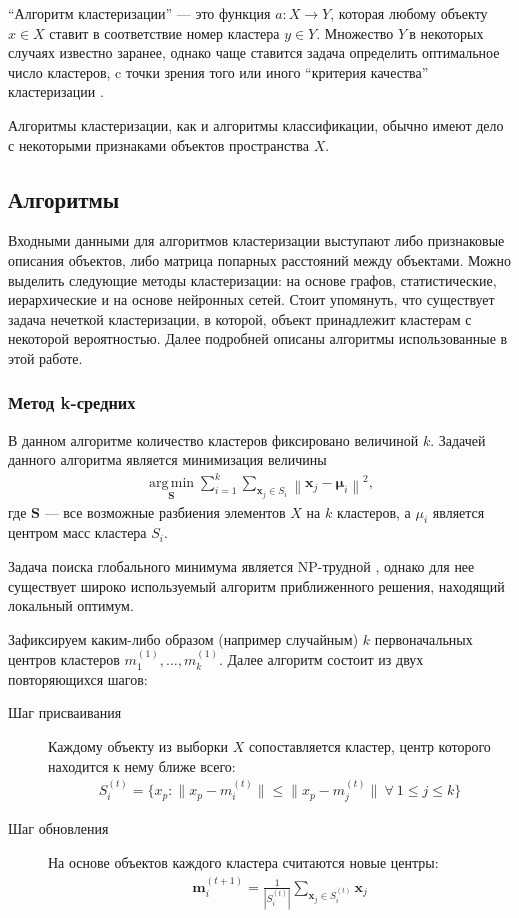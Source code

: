 ``Алгоритм кластеризации'' --- это функция $a\colon X\to Y$, которая любому объекту $x\in X$ ставит в соответствие номер кластера $y\in Y$. Множество $Y~$в некоторых случаях известно заранее, однако чаще ставится задача определить оптимальное число кластеров, c точки зрения того или иного ``критерия качества'' кластеризации \cite{wiki:ru-clusterization}.

Алгоритмы кластеризации, как и алгоритмы классификации, обычно имеют дело с некоторыми признаками объектов пространства $X$.

\subsection{Алгоритмы}
Входными данными для алгоритмов кластеризации выступают либо признаковые описания объектов, либо матрица попарных расстояний между объектами. Можно выделить следующие методы кластеризации: на основе графов, статистические, иерархические и на основе нейронных сетей. Стоит упомянуть, что существует задача нечеткой кластеризации, в которой, объект принадлежит кластерам с некоторой вероятностью. Далее подробней описаны алгоритмы использованные в этой работе. 

\subsubsection{Метод k-средних}
В данном алгоритме количество кластеров фиксировано величиной $k$. Задачей данного алгоритма является минимизация величины \begin{gather}
\underset{\mathbf{S}} {\operatorname{arg\,min}} \sum_{i=1}^{k} \sum_{\mathbf x_j \in S_i} \left\| \mathbf x_j - \boldsymbol\mu_i \right\|^2,
\end{gather} где $\mathbf{S}$ --- все возможные разбиения элементов $X$ на $k$ кластеров, а $\mu_i$ является центром масс кластера $S_i$. 

Задача поиска глобального минимума является NP-трудной \cite{springerlink:10.1007/s10994-009-5103-0}, однако для нее существует широко используемый алгоритм приближенного решения, находящий локальный оптимум.

Зафиксируем каким-либо образом (например случайным) $k$ первоначальных центров кластеров $m_1^{(1)}, \dots, m_k^{(1)}$. Далее алгоритм состоит из двух повторяющихся шагов:
\begin{description}
\item[Шаг присваивания] Каждому объекту из выборки $X$ сопоставляется кластер, центр которого находится к нему ближе всего: 
\begin{gather}
S_i^{(t)} = \big \{ x_p : \big \| x_p - m^{(t)}_i \big \| \le \big \| x_p - m^{(t)}_j \big \| \ \forall\ 1 \le j \le k \big\}
\end{gather}
\item[Шаг обновления] На основе объектов каждого кластера считаются новые центры: \begin{gather}
\mathbf m^{(t+1)}_i = \frac{1}{|S^{(t)}_i|} \sum_{\mathbf x_j \in S^{(t)}_i} \mathbf x_j
\end{gather}
\end{description}

